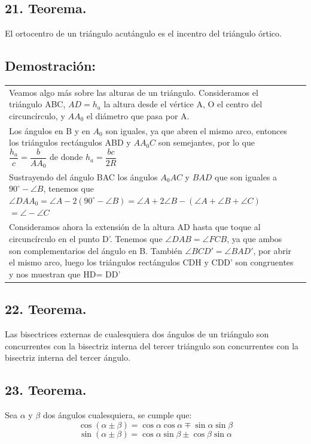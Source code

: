 \documentclass[12pt,a4paper]{article}
\begin{document}
\subsection*{21. Teorema.}
El ortocentro de un triángulo acutángulo es el incentro del triángulo órtico.
\subsection*{Demostración:}
\begin{tabular}{p{15.9 cm} p{1cm}}
Veamos algo más sobre las alturas de un triángulo. Consideramos el triángulo ABC, $AD=h_a$ la altura desde el vértice A, O el centro del circuncírculo, y $AA_0$ el diámetro que pasa por A.
\\Los ángulos en B y en $A_0$ son iguales, ya que abren el mismo arco, entonces los triángulos rectángulos ABD y $AA_0C$ son semejantes, por lo que $\dfrac{h_a}{c}=\dfrac{b}{AA_0}$ de donde $h_a=\dfrac{bc}{2R}$
\\Sustrayendo del ángulo BAC los ángulos $A_0AC$ y $BAD$ que son iguales a $90^\circ - \angle B$, tenemos que
$\angle DAA_0 = \angle A -2(90^\circ - \angle B)=\angle A + 2\angle B- (\angle A+ \angle B + \angle C)$
$=\angle - \angle C$
\\Consideramos ahora la extensión de la altura AD hasta que toque al circuncírculo en el punto D'. Tenemos que $\angle DAB = \angle FCB$, ya que ambos son complementarios  del ángulo en B. También $\angle BCD' = \angle BAD'$, por abrir  el mismo arco, luego los triángulos rectángulos CDH y CDD' son congruentes y nos muestran que HD= DD'
\end{tabular}
\subsection*{22. Teorema.}
Las bisectrices externas de cualesquiera dos ángulos de un triángulo son concurrentes con la bisectriz interna del tercer triángulo son concurrentes con la bisectriz interna del tercer ángulo.
\subsection*{23. Teorema.}
Sea $\alpha$ y $\beta$ dos ángulos cualesquiera, se cumple que:$$\cos ( \alpha \pm \beta) = \cos \alpha \cos \alpha \mp \sin \alpha \sin \beta$$
$$\sin (\alpha \pm \beta) = \cos \alpha \sin \beta \pm \cos \beta \sin \alpha$$
\end{document}
